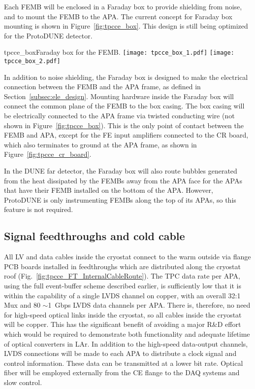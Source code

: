 Each FEMB will be enclosed in a Faraday box to provide shielding from noise, and to mount the FEMB 
to the APA. The current concept for Faraday box mounting is shown in Figure~\ref{fig:tpcce_box}. This
design is still being optimized for the ProtoDUNE detector.

\begin{cdrfigure}{tpcce_box}{Faraday box for the FEMB.}
\texttt{[image: tpcce\_box\_1.pdf]}
\texttt{[image: tpcce\_box\_2.pdf]}
\end{cdrfigure}

In addition to noise shielding, the Faraday box is designed to make the electrical connection 
between the FEMB and the APA frame, as defined in Section~\ref{subsec:ele_design}. Mounting 
hardware inside the Faraday box will connect the common plane of the FEMB to the box casing. The
box casing will be electrically connected to the APA frame via twisted conducting wire (not 
shown in Figure~\ref{fig:tpcce_box}). This is the only point of contact between the FEMB and
APA, except for the FE input amplifiers connected to the CR board, which also terminates to
ground at the APA frame, as shown in Figure~\ref{fig:tpcce_cr_board}.

In the DUNE far detector, the Faraday box will also route bubbles generated from the heat dissipated 
by the FEMBs away from the APA face for the APAs that have their FEMB installed on the bottom of
the APA. However, ProtoDUNE is only instrumenting FEMBs along the top of its APAs, so this feature
is not required.

%
\subsection{Signal feedthroughs and cold cable}
\label{subsec:ce_feedthrough}

All LV and data cables inside the cryostat connect to the warm outside via flange PCB boards installed in feedthroughs
which are distributed along the cryostat roof (Fig.~\ref{fig:tpcce_FT_InternalCableRoute}).
The TPC data rate per APA, using the full event-buffer scheme described earlier,
is sufficiently low that it is within the capability of a single LVDS channel on copper,
with an overall 32:1 Mux and 80 $\sim$1~Gbps LVDS data channels per APA.
There is, therefore, no need for high-speed optical links inside the 
cryostat, so all cables inside the cryostat will be copper.
This has the significant benefit of avoiding a major R\&D effort which would be required to demonstrate
both functionality and adequate lifetime of optical converters in LAr.
In addition to the high-speed data-output channels,
LVDS connections will be made to each APA to distribute a clock signal and control information.
These data can be transmitted at a lower bit rate.
Optical fiber will be employed externally from the CE flange to the DAQ systems and slow control.

